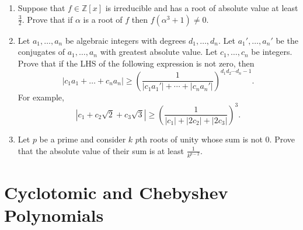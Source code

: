\begin{enumerate}
\item Suppose that $f\in\mathbb{Z}[x]$ is irreducible and has a root of absolute value at least $\frac 32$. Prove that if $\alpha$ is a root of $f$ then $f(\alpha^3+1)\neq 0$.

\item Let $a_1,\ldots, a_n$ be algebraic integers with degrees $d_1,\ldots, d_n$. Let $a_1',\ldots, a_n'$ be the conjugates of $a_1,\ldots, a_n$ with greatest absolute value. Let $c_1,\ldots, c_n$ be integers. Prove that if the LHS of the following expression is not zero, then
\[|c_1a_1+\ldots+c_na_n|\geq\left(\frac{1}{|c_1a_1'|+\cdots+|c_na_n'|}\right)^{d_1d_2\cdots d_n-1}.\]
For example, 
\[|c_1+c_2\sqrt{2}+c_3\sqrt{3}|\geq \left(\frac{1}{|c_1|+|2c_2|+|2c_3|}\right)^{3}.\]

\item Let $p$ be a prime and consider $k$ $p$th roots of unity whose sum is not 0. Prove that the absolute value of their sum is at least $\frac{1}{k^{p-2}}$.
\end{enumerate}

\section{Cyclotomic and Chebyshev Polynomials}

